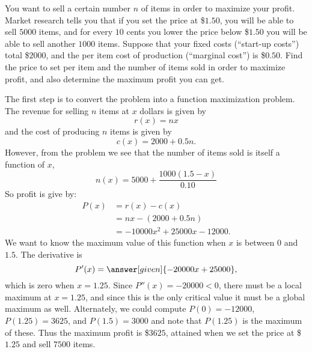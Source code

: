 \documentclass{ximera}
\begin{document}
\begin{example}
  You want to sell a certain number $n$ of items in order to maximize
  your profit.  Market research tells you that if you set the price at
  \$$1.50$, you will be able to sell $5000$ items, and for every $10$
  cents you lower the price below \$$1.50$ you will be able to sell
  another $1000$ items.  Suppose that your fixed costs (``start-up
  costs'') total \$$2000$, and the per item cost of production
  (``marginal cost'') is \$$0.50$.  Find the price to set per item and
  the number of items sold in order to maximize profit, and also
  determine the maximum profit you can get.
\begin{explanation}
The first step is to convert the problem into a function maximization
problem. The revenue for selling $n$ items at $x$ dollars is given by
\[
r(x) = nx
\]
and the cost of producing $n$ items is given by
\[
c(x) = 2000+0.5 n. 
\]
However, from the problem we see that the number of items sold is
itself a function of $x$,
\[
n(x) =5000+\frac{1000(1.5-x)}{0.10}
\]
So profit is give by:
\begin{align*}
P(x) &= r(x) - c(x)\\
&= nx - (2000+0.5 n)\\
&=-10000x^2+25000x-12000. 
\end{align*}
We want to know the maximum value of this function when $x$ is between
0 and $1.5$. The derivative is
\[
P'(x)=\answer[given]{-20000x+25000},
\]
which is zero when $x=1.25$. Since $P''(x)=-20000<0$, there must be a
local maximum at $x=1.25$, and since this is the only critical value
it must be a global maximum as well. Alternately, we could compute
$P(0)=-12000$, $P(1.25)=3625$, and $P(1.5)=3000$ and note that
$P(1.25)$ is the maximum of these. Thus the maximum profit is
\$$3625$, attained when we set the price at \$$1.25$ and sell $7500$
items.
\end{explanation}
\end{example}
\end{document}
